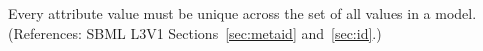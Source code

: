 Every  attribute value must be unique across the set of all
 values in a model.  (References: SBML L3V1 
Sections~\ref{sec:metaid} and~\ref{sec:id}.)
